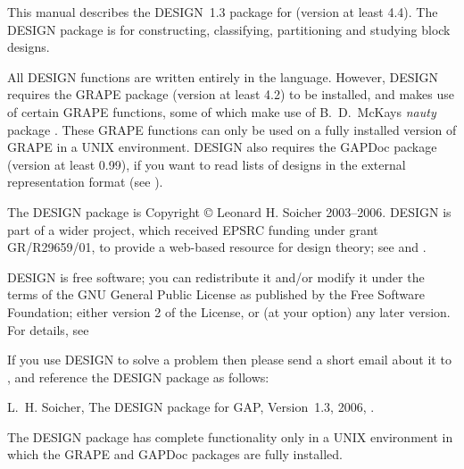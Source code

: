 %
%
%
%
\def\GRAPE{\sf GRAPE}
\def\DESIGN{\sf DESIGN}
\def\GAPDoc{\sf GAPDoc}
\def\nauty{\it nauty}
\def\Aut{{\rm Aut}\,} 


This manual describes the {\DESIGN}~1.3 package for {\GAP} (version at
least 4.4).  The {\DESIGN} package is for constructing, classifying,
partitioning and studying block designs.

All {\DESIGN} functions are written entirely in the {\GAP} language.
However, {\DESIGN} requires the {\GRAPE} package \cite{Grape} (version
at least 4.2) to be installed, and makes use of certain {\GRAPE}
functions, some of which make use of B.~D.~McKay{\pif}s {\nauty}
package \cite{Nauty}. These {\GRAPE} functions can only be used on a
fully installed version of {\GRAPE} in a UNIX environment. {\DESIGN} also
requires the {\GAPDoc} package \cite{GAPDoc} (version at least 0.99),
if you want to read lists of designs in the 
external representation format (see \cite{Extrep}).

The {\DESIGN} package is Copyright {\copyright} Leonard H. Soicher
2003--2006.  {\DESIGN} is part of a wider project, which received EPSRC
funding under grant GR/R29659/01, to provide a web-based resource for
design theory; see  and \cite{Dotw}.

{\DESIGN} is free software; you can redistribute it and/or modify
it under the terms of the GNU General Public License as published by
the Free Software Foundation; either version 2 of the License, or
(at your option) any later version. For details, see 

If you use {\DESIGN} to solve a problem then please send a short email
about it to , and reference the {\DESIGN} 
package as follows:

L.~H. Soicher, The {DESIGN} package for {GAP}, Version~1.3, 2006,
.


The {\DESIGN} package has complete functionality only in a UNIX
environment in which the {\GRAPE} and {\GAPDoc} packages are fully
installed.

